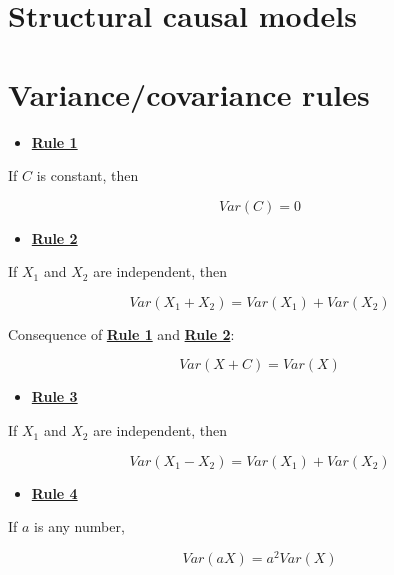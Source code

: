 \documentclass[
]{book}
\providecommand{\tightlist}{%
  \setlength{\itemsep}{0pt}\setlength{\parskip}{0pt}}
\begin{document}
\hypertarget{structural-causal-models}{%
\chapter{Structural causal models}\label{structural-causal-models}}

\hypertarget{appendix-appendix}{%
\appendix}


\hypertarget{appendix-rules}{%
\chapter{Variance/covariance rules}\label{appendix-rules}}

\begin{itemize}
\tightlist
\item
  \href{./variance.html\#Rule1}{\textbf{Rule 1}}
\end{itemize}

If \(C\) is constant, then

\[
Var\left(C\right) = 0
\]

\begin{itemize}
\tightlist
\item
  \href{./variance.html\#Rule2}{\textbf{Rule 2}}
\end{itemize}

If \(X_{1}\) and \(X_{2}\) are independent, then

\[
Var\left(X_{1} + X_{2}\right) =
Var\left(X_{1}\right) + Var\left(X_{2}\right)
\]

Consequence of \href{./variance.html\#Rule1}{\textbf{Rule 1}} and \href{./variance.html\#Rule2}{\textbf{Rule 2}}:

\[
Var\left(X + C\right) = Var\left(X\right)
\]

\begin{itemize}
\tightlist
\item
  \href{./variance.html\#Rule3}{\textbf{Rule 3}}
\end{itemize}

If \(X_{1}\) and \(X_{2}\) are independent, then

\[
Var\left(X_{1} - X_{2}\right) =
Var\left(X_{1}\right) + Var\left(X_{2}\right)
\]

\begin{itemize}
\tightlist
\item
  \href{./variance.html\#Rule4}{\textbf{Rule 4}}
\end{itemize}

If \(a\) is any number,

\[
Var\left(aX\right) = a^2 Var\left(X\right)
\]
\end{document}
